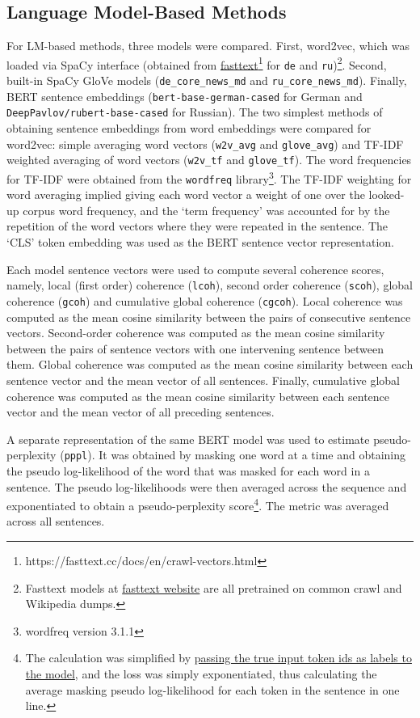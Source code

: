 \subsection{Language Model-Based Methods}
For LM-based methods, three models were compared. First, word2vec, which was loaded via SpaCy interface (obtained from \href{https://fasttext.cc/docs/en/crawl-vectors.html}{fasttext}\footnote{https://fasttext.cc/docs/en/crawl-vectors.html} for \texttt{de} and \texttt{ru})\footnote{Fasttext models at \href{https://fasttext.cc/docs/en/crawl-vectors.html}{fasttext website} are all pretrained on common crawl and Wikipedia dumps.}. Second, built-in SpaCy GloVe models (\texttt{de\_core\_news\_md} and \texttt{ru\_core\_news\_md}). Finally, BERT sentence embeddings (\texttt{bert-base-german-cased} for German and  \texttt{DeepPavlov/rubert-base-cased} for Russian). The two simplest methods of obtaining sentence embeddings from word embeddings were compared for word2vec: simple averaging word vectors (\texttt{w2v\_avg} and \texttt{glove\_avg}) and TF-IDF weighted averaging of word vectors (\texttt{w2v\_tf} and \texttt{glove\_tf}). The word frequencies for TF-IDF were obtained from the \texttt{wordfreq} library\footnote{wordfreq version 3.1.1}. The TF-IDF weighting for word averaging implied giving each word vector a weight of one over the looked-up corpus word frequency, and the `term frequency' was accounted for by the repetition of the word vectors where they were repeated in the sentence. The `CLS' token embedding was used as the BERT sentence vector representation.

Each model sentence vectors were used to compute several coherence scores, namely, local (first order) coherence (\texttt{lcoh}), second order coherence (\texttt{scoh}), global coherence (\texttt{gcoh}) and cumulative global coherence (\texttt{cgcoh}). Local coherence was computed as the mean cosine similarity between the pairs of consecutive sentence vectors. Second-order coherence was computed as the mean cosine similarity between the pairs of sentence vectors with one intervening sentence between them. Global coherence was computed as the mean cosine similarity between each sentence vector and the mean vector of all sentences. Finally, cumulative global coherence was computed as the mean cosine similarity between each sentence vector and the mean vector of all preceding sentences.

A separate representation of the same BERT model was used to estimate pseudo-perplexity (\texttt{pppl}). It was obtained by masking one word at a time and obtaining the pseudo log-likelihood of the word that was masked for each word in a sentence. The pseudo log-likelihoods were then averaged across the sequence and exponentiated to obtain a pseudo-perplexity score\footnote{The calculation was simplified by \href{https://huggingface.co/docs/transformers/perplexity}{passing the true input token ids as labels to the model}, and the loss was simply exponentiated, thus calculating the average masking pseudo log-likelihood for each token in the sentence in one line.}. The metric was averaged across all sentences.

